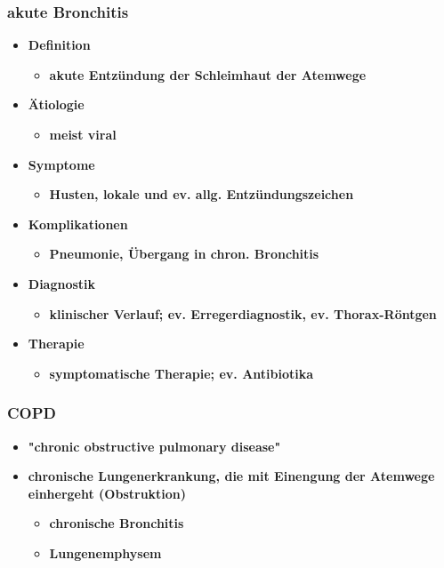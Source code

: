 	\subsubsection{akute Bronchitis}
		\begin{itemize}
			\item \textbf{Definition}
				\begin{itemize}
					\item \textbf{akute Entzündung der Schleimhaut der Atemwege}
				\end{itemize}
			\item \textbf{Ätiologie}
				\begin{itemize}
					\item \textbf{meist viral}
				\end{itemize}
			\item \textbf{Symptome}
				\begin{itemize}
					\item \textbf{Husten, lokale und ev. allg. Entzündungszeichen}
				\end{itemize}
			\item \textbf{Komplikationen}
				\begin{itemize}
					\item \textbf{Pneumonie, Übergang in chron. Bronchitis}
				\end{itemize}
			\item \textbf{Diagnostik}
				\begin{itemize}
					\item \textbf{klinischer Verlauf; ev. Erregerdiagnostik, ev. Thorax-Röntgen}
				\end{itemize}
			\item \textbf{Therapie}
				\begin{itemize}
					\item \textbf{symptomatische Therapie; ev. Antibiotika}
				\end{itemize}
		\end{itemize}
	\subsubsection{COPD}
		\begin{itemize}
			\item \textbf{"chronic obstructive pulmonary disease"}
			\item \textbf{chronische Lungenerkrankung, die mit Einengung der Atemwege einhergeht (Obstruktion)}
				\begin{itemize}
					\item \textbf{chronische Bronchitis}
					\item \textbf{Lungenemphysem}
				\end{itemize}
		\end{itemize}
